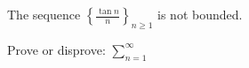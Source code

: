 \documentclass{article}
\begin{document}
\begin{problem}{}
    The sequence $\displaystyle \left\{ \frac{\tan n}{n} \right\}_{n \geq 1}$ is not bounded. 
\end{problem}

\begin{problem}{}
    Prove or disprove: $\displaystyle \sum_{n = 1}^\infty $
\end{problem}
\end{document}
